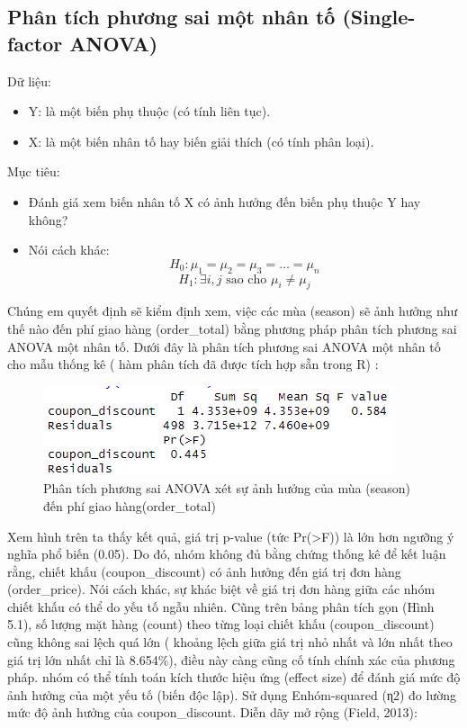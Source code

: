 \subsection{Phân tích phương sai một nhân tố (Single-factor ANOVA)}

Dữ liệu:
\begin{itemize}
    \item Y: là một biến phụ thuộc (có tính liên tục).
    \item X: là một biến nhân tố hay biến giải thích (có tính phân loại).
\end{itemize}

Mục tiêu:
\begin{itemize}
    \item Đánh giá xem biến nhân tố X có ảnh hưởng đến biến phụ thuộc Y hay không?
    \item Nói cách khác:
    \[
        H_{0}: \mu_{1} = \mu_{2} = \mu_{3} = \dots = \mu_{n}
        \]
        \[
        H_{1}: \exists i, j \text{ sao cho } \mu_{i} \neq \mu_{j}
        \]
\end{itemize}
Chúng em quyết định sẽ kiểm định xem, việc các mùa (season) sẽ ảnh hưởng như thế nào đến phí giao hàng (order\_total) bằng phương pháp phân tích phương sai ANOVA một nhân tố. Dưới đây là phân tích phương sai ANOVA một nhân tố cho mẫu thống kê ( hàm phân tích đã được tích hợp sẵn trong R) :

\begin{figure}[!htbp]
    \centering
    \includegraphics[width=0.4\linewidth]{graphics/5.3.2.png}
    \caption{Phân tích phương sai ANOVA xét sự ảnh hưởng của mùa (season) đến phí giao hàng(order\_total)}
\end{figure}

Xem hình trên ta thấy kết quả, giá trị p-value (tức Pr(>F)) là  lớn hơn ngưỡng ý nghĩa phổ biến (0.05). Do đó, nhóm không đủ bằng chứng thống kê để kết luận rằng, chiết khấu (coupon\_discount) có ảnh hưởng đến giá trị đơn hàng (order\_price). Nói cách khác, sự khác biệt về giá trị đơn hàng giữa các nhóm chiết khấu có thể do yếu tố ngẫu nhiên.
Cũng trên bảng phân tích gọn (Hình 5.1),  số lượng mặt hàng (count) theo từng loại chiết khấu (coupon\_discount) cũng  không sai lệch quá lớn ( khoảng lệch giữa giá trị nhỏ nhất và lớn nhất theo giá trị lớn nhất chỉ là 8.654\%), điều này càng cũng cố tính chính xác của phương pháp.
nhóm có thể tính toán kích thước hiệu ứng (effect size) để đánh giá mức độ ảnh hưởng của một yếu tố (biến độc lập). Sử dụng Enhóm-squared (ɳ2) đo lường mức độ ảnh hưởng của coupon\_discount. Diễn dãy mở rộng (Field, 2013):

